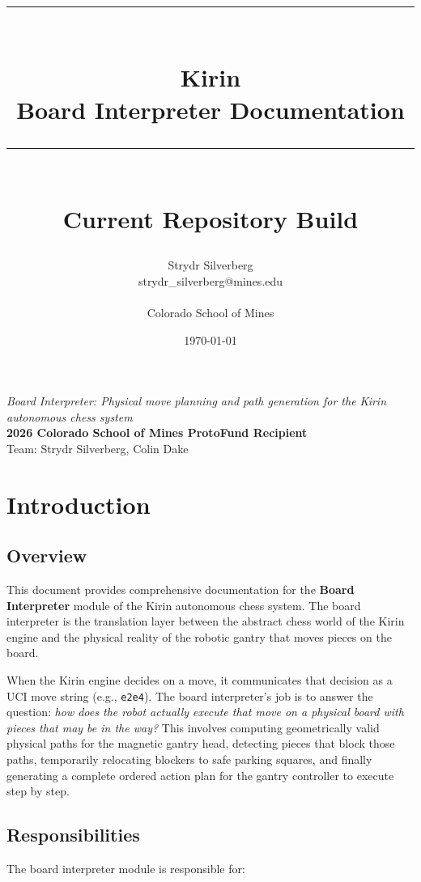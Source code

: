 \documentclass[11pt,a4paper]{report}
\title{%
    \vspace{-1cm}
    \rule{\textwidth}{1pt}\\[0.5cm]
    {\Huge\bfseries Kirin}\\[0.3cm]
    {\Large Board Interpreter Documentation}\\[0.3cm]
    \rule{\textwidth}{1pt}\\[1cm]
    {\large Current Repository Build}
}
\author{Strydr Silverberg\\strydr\_silverberg@mines.edu\\\\Colorado School of Mines}
\date{\today}
\begin{document}
\maketitle
\thispagestyle{empty}

\vfill
\begin{center}
    \textit{Board Interpreter: Physical move planning and path generation for the Kirin autonomous chess system}\\[1em]
    \textbf{2026 Colorado School of Mines ProtoFund Recipient}\\
    Team: Strydr Silverberg, Colin Dake
\end{center}
\vfill

\newpage
\tableofcontents
\newpage

\chapter{Introduction}

\section{Overview}

This document provides comprehensive documentation for the \textbf{Board Interpreter} module of the Kirin autonomous chess system. The board interpreter is the translation layer between the abstract chess world of the Kirin engine and the physical reality of the robotic gantry that moves pieces on the board.

When the Kirin engine decides on a move, it communicates that decision as a UCI move string (e.g., \texttt{e2e4}). The board interpreter's job is to answer the question: \emph{how does the robot actually execute that move on a physical board with pieces that may be in the way?} This involves computing geometrically valid physical paths for the magnetic gantry head, detecting pieces that block those paths, temporarily relocating blockers to safe parking squares, and finally generating a complete ordered action plan for the gantry controller to execute step by step.

\section{Responsibilities}

The board interpreter module is responsible for:
\end{document}

